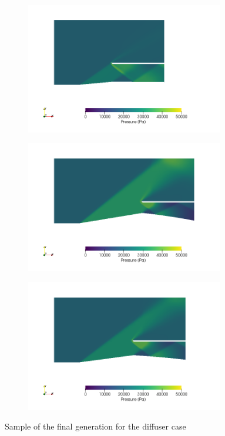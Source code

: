 \begin{figure}[h!]
    \centering
    \begin{subfigure}[t]{0.31\textwidth}
        \includegraphics[width=0.95\textwidth, height=0.18\textheight]{Figures/4/SCpg5i9.png}
    \end{subfigure}
    \begin{subfigure}[t]{0.31\textwidth}
        \includegraphics[width=0.95\textwidth, height=0.18\textheight]{Figures/4/SCpg5i14.png}
    \end{subfigure}
    \begin{subfigure}[t]{0.31\textwidth}
        \includegraphics[width=0.95\textwidth, height=0.18\textheight]{Figures/4/SCpg5i18.png}
    \end{subfigure}
    \caption{Sample of the final generation for the diffuser case}
    \label{fig:finalDif}
\end{figure}


